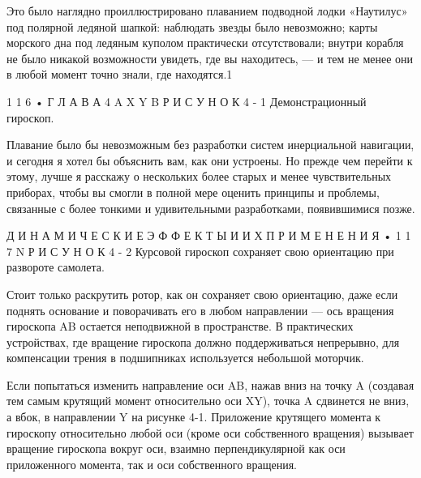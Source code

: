 \documentclass[10pt,oneside]{article}
\newcommand{\TipsSubsection}[1]{\par\vspace{6bp}{\normalsize\bfseries #1\par}\vspace{2bp}}
\begin{document}
Это было наглядно проиллюстрировано плаванием подводной лодки «Наутилус» под полярной ледяной шапкой: наблюдать звезды было невозможно; карты морского дна под ледяным куполом практически отсутствовали; внутри корабля не было никакой возможности увидеть, где вы находитесь, --- и тем не менее они в любой момент точно знали, где находятся.1\par

1 1 6 • Г Л А В А  4 A X Y B Р И С У Н О К  4 - 1 Демонстрационный гироскоп.\par

Плавание было бы невозможным без разработки систем инерциальной навигации, и сегодня я хотел бы объяснить вам, как они устроены. Но прежде чем перейти к этому, лучше я расскажу о нескольких более старых и менее чувствительных приборах, чтобы вы смогли в полной мере оценить принципы и проблемы, связанные с более тонкими и удивительными разработками, появившимися позже.\par

\TipsSubsection{4-1 Демонстрационный гироскоп Если вы никогда не видели подобных вещей, на рисунке 4-1 показан демонстрационный гироскоп в карданном подвесе. 1В 1958 году атомная подводная лодка USS Nautilus, первая в мире атомная подводная лодка, совершила переход из Гавайев в Англию, пройдя Северный полюс 3 августа. Под полярной ледяной шапкой она находилась в общей сложности 95 часов.}

Д И Н А М И Ч Е С К И Е  Э Ф Ф Е К Т Ы  И  И Х  П Р И М Е Н Е Н И Я • 1 1 7 N Р И С У Н О К  4 - 2 Курсовой гироскоп сохраняет свою ориентацию при развороте самолета.\par

Стоит только раскрутить ротор, как он сохраняет свою ориентацию, даже если поднять основание и поворачивать его в любом направлении --- ось вращения гироскопа AB остается неподвижной в пространстве. В практических устройствах, где вращение гироскопа должно поддерживаться непрерывно, для компенсации трения в подшипниках используется небольшой моторчик.\par

Если попытаться изменить направление оси AB, нажав вниз на точку A (создавая тем самым крутящий момент относительно оси XY), точка A сдвинется не вниз, а вбок, в направлении Y на рисунке 4-1. Приложение крутящего момента к гироскопу относительно любой оси (кроме оси собственного вращения) вызывает вращение гироскопа вокруг оси, взаимно перпендикулярной как оси приложенного момента, так и оси собственного вращения.\par
\end{document}
